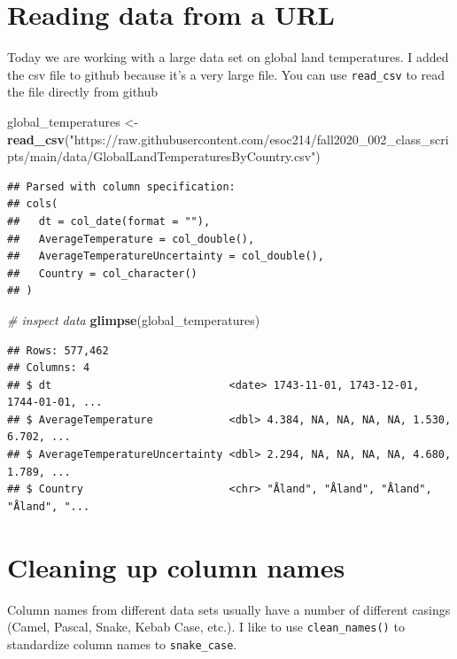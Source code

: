 \documentclass[
]{book}
\newenvironment{Shaded}{\begin{snugshade}}{\end{snugshade}}
\newcommand{\CommentTok}[1]{\textcolor[rgb]{0.56,0.35,0.01}{\textit{#1}}}
\newcommand{\KeywordTok}[1]{\textcolor[rgb]{0.13,0.29,0.53}{\textbf{#1}}}
\newcommand{\NormalTok}[1]{#1}
\newcommand{\StringTok}[1]{\textcolor[rgb]{0.31,0.60,0.02}{#1}}
\begin{document}
\hypertarget{reading-data-from-a-url}{%
\section{Reading data from a URL}\label{reading-data-from-a-url}}

Today we are working with a large data set on global land temperatures. I added the csv file to github because it's a very large file. You can use \texttt{read\_csv} to read the file directly from github

\begin{Shaded}
\begin{Highlighting}[]
\NormalTok{global_temperatures <-}\StringTok{ }\KeywordTok{read_csv}\NormalTok{(}\StringTok{"https://raw.githubusercontent.com/esoc214/fall2020_002_class_scripts/main/data/GlobalLandTemperaturesByCountry.csv"}\NormalTok{) }
\end{Highlighting}
\end{Shaded}

\begin{verbatim}
## Parsed with column specification:
## cols(
##   dt = col_date(format = ""),
##   AverageTemperature = col_double(),
##   AverageTemperatureUncertainty = col_double(),
##   Country = col_character()
## )
\end{verbatim}

\begin{Shaded}
\begin{Highlighting}[]
\CommentTok{# inspect data}
\KeywordTok{glimpse}\NormalTok{(global_temperatures)}
\end{Highlighting}
\end{Shaded}

\begin{verbatim}
## Rows: 577,462
## Columns: 4
## $ dt                            <date> 1743-11-01, 1743-12-01, 1744-01-01, ...
## $ AverageTemperature            <dbl> 4.384, NA, NA, NA, NA, 1.530, 6.702, ...
## $ AverageTemperatureUncertainty <dbl> 2.294, NA, NA, NA, NA, 4.680, 1.789, ...
## $ Country                       <chr> "Åland", "Åland", "Åland", "Åland", "...
\end{verbatim}

\hypertarget{cleaning-up-column-names}{%
\section{Cleaning up column names}\label{cleaning-up-column-names}}

Column names from different data sets usually have a number of different casings (Camel, Pascal, Snake, Kebab Case, etc.). I like to use \texttt{clean\_names()} to standardize column names to \texttt{snake\_case}.
\end{document}
